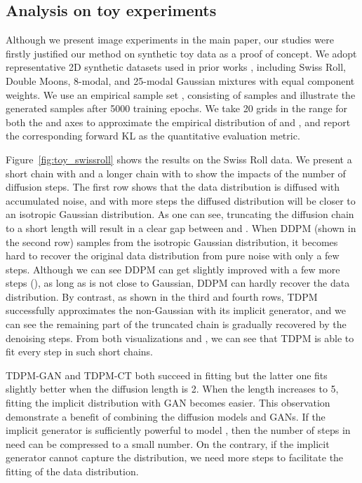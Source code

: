 \documentclass{article} \usepackage{iclr2023_conference,times}
\def\Figref#1{Figure~\ref{#1}}
\theoremstyle{plain}
\theoremstyle{definition}
\theoremstyle{remark}
\begin{document}
{\subsection{Analysis on toy experiments}\label{sec:toy experiments}
Although we present image experiments in the main paper, our studies were firstly justified our method on synthetic toy data as a proof of concept. We adopt representative 2D synthetic datasets used in prior works \citep{gulrajani2017improved,zheng2021exploiting}, including Swiss Roll, Double Moons, 8-modal, and 25-modal Gaussian mixtures with equal component weights. We use an empirical sample set , consisting of  samples and illustrate the generated samples after 5000 training epochs. We take 20 grids in the range  for both the  and  axes to approximate the empirical distribution of  and , and report the corresponding forward KL  as the quantitative evaluation metric. 

{\Figref{fig:toy_swissroll} shows the results on the Swiss Roll data. We present a short chain with  and a longer chain with  to show the impacts of the number of diffusion steps. The first row shows that the data distribution is diffused with accumulated noise, and with more steps the diffused distribution will be closer to an isotropic Gaussian distribution. As one can see, truncating the diffusion chain to a short length will 
result in a clear gap between  and . When DDPM (shown in the second row) samples from the isotropic Gaussian distribution, it becomes hard to recover the original data distribution from pure noise with only a few steps. Although we can see DDPM can get slightly improved with a few more steps (), as long as  is not close to Gaussian, DDPM can hardly recover the data distribution. By contrast, as shown in the third and fourth rows, TDPM successfully approximates the non-Gaussian  with its implicit generator, and we can see the remaining part of the truncated chain is gradually recovered by the denoising steps. From both visualizations and , we can see that TDPM is able to fit every step in such short chains.}

TDPM-GAN and TDPM-CT both succeed in fitting  but the latter one fits slightly better when the diffusion length is 2.
When the length increases to 5, fitting the implicit distribution with GAN becomes easier. 
This observation demonstrate a benefit of combining the diffusion models and GANs. 
If the implicit generator is sufficiently powerful to model , then the number of steps in need can be compressed to a small number. On the contrary, if the implicit generator cannot capture the distribution, we need more steps to facilitate the fitting of the data distribution. 

}
\end{document}
